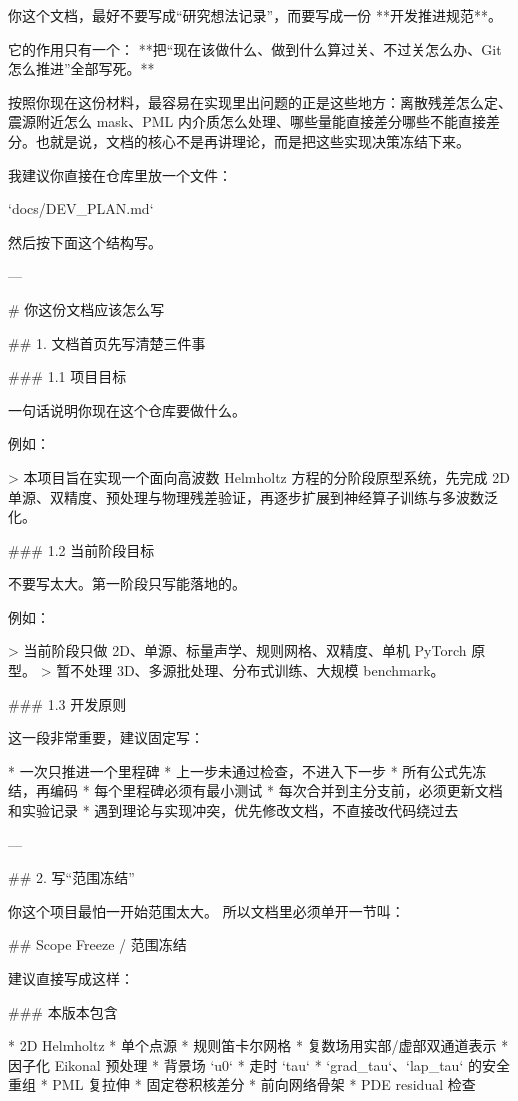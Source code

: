你这个文档，最好不要写成“研究想法记录”，而要写成一份 **开发推进规范**。

它的作用只有一个：
**把“现在该做什么、做到什么算过关、不过关怎么办、Git 怎么推进”全部写死。**

按照你现在这份材料，最容易在实现里出问题的正是这些地方：离散残差怎么定、震源附近怎么 mask、PML 内介质怎么处理、哪些量能直接差分哪些不能直接差分。也就是说，文档的核心不是再讲理论，而是把这些实现决策冻结下来。 

我建议你直接在仓库里放一个文件：

`docs/DEV_PLAN.md`

然后按下面这个结构写。

---

# 你这份文档应该怎么写

## 1. 文档首页先写清楚三件事

### 1.1 项目目标

一句话说明你现在这个仓库要做什么。

例如：

> 本项目旨在实现一个面向高波数 Helmholtz 方程的分阶段原型系统，先完成 2D 单源、双精度、预处理与物理残差验证，再逐步扩展到神经算子训练与多波数泛化。

### 1.2 当前阶段目标

不要写太大。第一阶段只写能落地的。

例如：

> 当前阶段只做 2D、单源、标量声学、规则网格、双精度、单机 PyTorch 原型。
> 暂不处理 3D、多源批处理、分布式训练、大规模 benchmark。

### 1.3 开发原则

这一段非常重要，建议固定写：

* 一次只推进一个里程碑
* 上一步未通过检查，不进入下一步
* 所有公式先冻结，再编码
* 每个里程碑必须有最小测试
* 每次合并到主分支前，必须更新文档和实验记录
* 遇到理论与实现冲突，优先修改文档，不直接改代码绕过去

---

## 2. 写“范围冻结”

你这个项目最怕一开始范围太大。
所以文档里必须单开一节叫：

## Scope Freeze / 范围冻结

建议直接写成这样：

### 本版本包含

* 2D Helmholtz
* 单个点源
* 规则笛卡尔网格
* 复数场用实部/虚部双通道表示
* 因子化 Eikonal 预处理
* 背景场 `u0`
* 走时 `tau`
* `grad_tau`、`lap_tau` 的安全重组
* PML 复拉伸
* 固定卷积核差分
* 前向网络骨架
* PDE residual 检查

